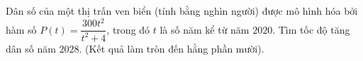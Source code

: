 \begin{ex}%
	Dân số của một thị trấn ven biển (tính bằng nghìn người) được mô hình hóa bởi hàm số $P(t)=\dfrac{300t^2}{t^2+4}$, trong đó $t$ là số năm kể từ năm $2020$. Tìm tốc độ tăng dân số năm $2028$. (Kết quả làm tròn đến hằng phần mười).
	
\end{ex}

